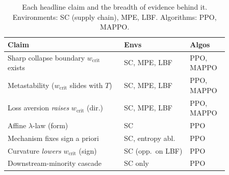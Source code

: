 \documentclass[letterpaper]{article} %
\theoremstyle{plain}
\newcommand{\wcrit}{w_{\mathrm{crit}}}
\begin{document}
\begin{table}[h]
\centering \small
\caption{Each headline claim and the breadth of evidence behind it. Environments: SC (supply
chain), MPE, LBF. Algorithms: PPO, MAPPO.}
\label{tab:claim_ledger}
\begin{tabular}{p{0.46\linewidth}p{0.26\linewidth}p{0.14\linewidth}}
\toprule
Claim & Envs & Algos \\
\midrule
Sharp collapse boundary $\wcrit$ exists & SC, MPE, LBF & PPO, MAPPO \\
Metastability ($\wcrit$ slides with $T$) & SC, MPE, LBF & PPO, MAPPO \\
Loss aversion \emph{raises} $\wcrit$ (dir.) & SC, MPE, LBF & PPO, MAPPO \\
Affine $\lambda$-law (form) & SC & PPO \\
Mechanism fixes sign a priori & SC, entropy abl. & PPO \\
Curvature \emph{lowers} $\wcrit$ (sign) & SC (opp.\ on LBF) & PPO \\
Downstream-minority cascade & SC only & PPO \\
\bottomrule
\end{tabular}
\end{table}


\end{document}
